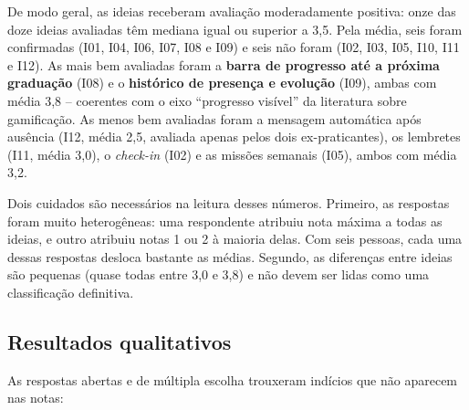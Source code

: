 De modo geral, as ideias receberam avaliação moderadamente positiva: onze
das doze ideias avaliadas têm mediana igual ou superior a 3,5. Pela
média, seis foram confirmadas (I01, I04, I06, I07, I08 e I09) e seis não
foram (I02, I03, I05, I10, I11 e I12). As mais
bem avaliadas foram a \textbf{barra de progresso até a próxima
graduação} (I08) e o \textbf{histórico de presença e evolução} (I09),
ambas com média 3,8 -- coerentes com o eixo ``progresso visível'' da
literatura sobre gamificação. As menos bem avaliadas foram a mensagem
automática após ausência (I12, média 2,5, avaliada apenas pelos dois
ex-praticantes), os lembretes (I11, média 3,0), o \textit{check-in}
(I02) e as missões semanais (I05), ambos com média 3,2.

Dois cuidados são necessários na leitura desses números. Primeiro, as
respostas foram muito heterogêneas: uma respondente atribuiu nota máxima
a todas as ideias, e outro atribuiu notas 1 ou 2 à maioria delas. Com
seis pessoas, cada uma dessas respostas desloca bastante as médias.
Segundo, as diferenças entre ideias são pequenas (quase todas entre 3,0
e 3,8) e não devem ser lidas como uma classificação definitiva.

\subsection{Resultados qualitativos}

As respostas abertas e de múltipla escolha trouxeram indícios que não
aparecem nas notas:

